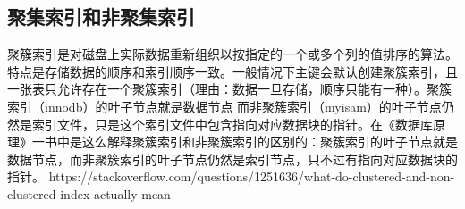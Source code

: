 \documentclass[../../../interview-questions.tex]{subfiles}
\begin{document}
\subsection{聚集索引和非聚集索引}

聚簇索引是对磁盘上实际数据重新组织以按指定的一个或多个列的值排序的算法。特点是存储数据的顺序和索引顺序一致。一般情况下主键会默认创建聚簇索引，且一张表只允许存在一个聚簇索引（理由：数据一旦存储，顺序只能有一种）。聚簇索引（innodb）的叶子节点就是数据节点 而非聚簇索引（myisam）的叶子节点仍然是索引文件，只是这个索引文件中包含指向对应数据块的指针。在《数据库原理》一书中是这么解释聚簇索引和非聚簇索引的区别的：聚簇索引的叶子节点就是数据节点，而非聚簇索引的叶子节点仍然是索引节点，只不过有指向对应数据块的指针。
https://stackoverflow.com/questions/1251636/what-do-clustered-and-non-clustered-index-actually-mean
\end{document}
